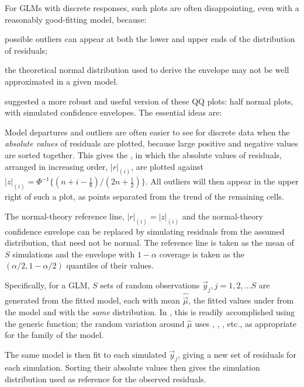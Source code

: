 \documentclass[11pt]{book}\usepackage[]{graphicx}\usepackage[]{color}
\begin{document}
For GLMs with discrete responses, such plots are often disappointing, even with a 
reasonably good-fitting model, because:
\begin{seriate}
  \item possible outliers can appear at both the lower and upper ends of the distribution of residuals;
  \item the theoretical normal distribution used to derive the envelope may not be well approximated in 
  a given model.
\end{seriate}

\citet{Atkinson:81,Atkinson:87} suggested a more robust and useful version of these QQ plots:
half normal plots, with simulated confidence envelopes.
The essential ideas are:
\begin{itemize*}
 \item Model departures and outliers are often easier to see for
discrete data when the \emph{absolute values} of residuals are plotted,
because large positive and negative values are sorted together.
This gives the , in which the
absolute values of residuals,  arranged in increasing order, $|r|_{(i)}$,
are plotted
against
$|z|_{(i)} = \Phi^{-1} \{ (n+i-\frac{1}{8}) / (2n + \frac{1}{2}) \}$.
All outliers will then appear  in the upper right of such a plot,
as points separated from the trend of the remaining cells.

  \item The normal-theory reference line, $|r|_{(i)} = |z|_{(i)}$
and the normal-theory confidence envelope can be replaced by simulating residuals
from the assumed distribution, that need not be normal. 
The reference line is taken as the mean
of $S$ simulations and the envelope with $1-\alpha$ coverage is taken as
the $(\alpha/2, 1-\alpha/2)$ quantiles of their values.

  \item Specifically, for a GLM, $S$ sets of random observations $\vec{y}_j, j=1, 2, \dots S$
are generated from the fitted model, each with mean $\widehat{\vec{\mu}}$,
the fitted values under from the model and with the \emph{same} distribution.
In \R, this is readily accomplished using the generic
 function;
the random variation around $\widehat{\mu}$ uses , ,
, etc., as appropriate for the family of the model.

  \item The same model is then fit
to each simulated $\vec{y}_j$, giving a new set of residuals for each simulation.
Sorting their absolute values then gives the simulation distribution used as
reference for the observed residuals.
\end{itemize*}
\end{document}
